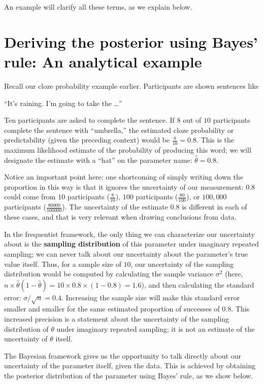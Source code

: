 \documentclass[12pt,]{krantz}
\theoremstyle{definition}
\theoremstyle{definition}
\theoremstyle{definition}
\theoremstyle{remark}
\begin{document}
An example will clarify all these terms, as we explain below.

\hypertarget{sec:analytical}{%
\section{Deriving the posterior using Bayes' rule: An analytical example}\label{sec:analytical}}

Recall our cloze probability example earlier. Participants are shown sentences like

``It's raining. I'm going to take the \ldots{}''

Ten participants are asked to complete the sentence.
If \(8\) out of \(10\) participants complete the sentence with ``umbrella,'' the estimated cloze probability or predictability (given the preceding context) would be \(\frac{8}{10}=0.8\). This is the maximum likelihood estimate of the probability of producing this word; we will designate the estimate with a ``hat'' on the parameter name: \(\hat \theta=0.8\).

Notice an important point here: one shortcoming of simply writing down the proportion in this way is that it ignores the uncertainty of our measurement: \(0.8\) could come from \(10\) participants (\(\frac{8}{10}\)), \(100\) participants (\(\frac{80}{100}\)), or \(100,000\) participants (\(\frac{80000}{100000}\)). The uncertainty of the estimate \(0.8\) is different in each of these cases, and that is very relevant when drawing conclusions from data.

In the frequentist framework, the only thing we can characterize our uncertainty about is the \textbf{sampling distribution} of this parameter under imaginary repeated sampling; we can never talk about our uncertainty about the parameter's true value itself.
Thus, for a sample size of \(10\), our uncertainty of the sampling distribution would be computed by calculating the sample variance \(\sigma^2\) (here, \(n\times \hat\theta(1-\hat\theta)= 10\times 0.8 \times (1-0.8)=1.6\)), and then calculating the standard error: \(\sigma/\sqrt{n}=0.4\). Increasing the sample size will make this standard error smaller and smaller for the same estimated proportion of successes of \(0.8\). This increased precision is a statement about the uncertainty of the sampling distribution of \(\theta\) under imaginary repeated sampling; it is not an estimate of the uncertainty of \(\theta\) itself.

The Bayesian framework gives us the opportunity to talk directly about our uncertainty of the parameter itself, given the data. This is achieved by obtaining the posterior distribution of the parameter using Bayes' rule, as we show below.
\end{document}
